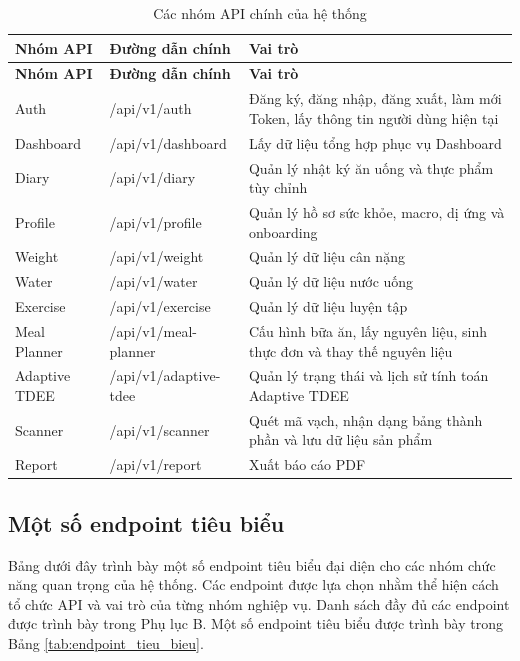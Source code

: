 \documentclass[12pt, a4paper]{report}
\begin{document}
\begin{longtable}{|>{\raggedright\arraybackslash}p{4cm}|>{\raggedright\arraybackslash}p{4cm}|p{7cm}|}
\caption{Các nhóm API chính của hệ thống}
\label{tab:nhom_api_chinh} \\
\hline
\textbf{Nhóm API} & \textbf{Đường dẫn chính} & \textbf{Vai trò} \\
\hline
\endfirsthead
\hline
\textbf{Nhóm API} & \textbf{Đường dẫn chính} & \textbf{Vai trò} \\
\hline
\endhead

Auth & /api/v1/auth & Đăng ký, đăng nhập, đăng xuất, làm mới Token, lấy thông tin người dùng hiện tại \\
\hline
Dashboard & /api/v1/dashboard & Lấy dữ liệu tổng hợp phục vụ Dashboard \\
\hline
Diary & /api/v1/diary & Quản lý nhật ký ăn uống và thực phẩm tùy chỉnh \\
\hline
Profile & /api/v1/profile & Quản lý hồ sơ sức khỏe, macro, dị ứng và onboarding \\
\hline
Weight & /api/v1/weight & Quản lý dữ liệu cân nặng \\
\hline
Water & /api/v1/water & Quản lý dữ liệu nước uống \\
\hline
Exercise & /api/v1/exercise & Quản lý dữ liệu luyện tập \\
\hline
Meal Planner & /api/v1/meal-planner & Cấu hình bữa ăn, lấy nguyên liệu, sinh thực đơn và thay thế nguyên liệu \\
\hline
Adaptive TDEE & /api/v1/adaptive-tdee & Quản lý trạng thái và lịch sử tính toán Adaptive TDEE \\
\hline
Scanner & /api/v1/scanner & Quét mã vạch, nhận dạng bảng thành phần và lưu dữ liệu sản phẩm \\
\hline
Report & /api/v1/report & Xuất báo cáo PDF \\
\hline
\end{longtable}

\subsection{Một số endpoint tiêu biểu}Bảng dưới đây trình bày một số endpoint tiêu biểu đại diện cho các nhóm chức năng quan trọng của hệ thống. Các endpoint được lựa chọn nhằm thể hiện cách tổ chức API và vai trò của từng nhóm nghiệp vụ. Danh sách đầy đủ các endpoint được trình bày trong Phụ lục B. Một số endpoint tiêu biểu được trình bày trong Bảng \ref{tab:endpoint_tieu_bieu}.
\end{document}
